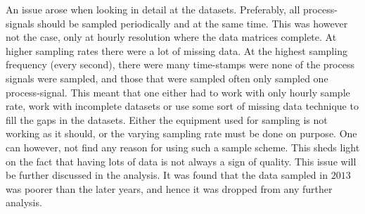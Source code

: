         
        
        An issue arose when looking in detail at the datasets. Preferably, all process-signals should be sampled periodically and at the same time. This was however not the case, only at hourly resolution where the data matrices complete. At higher sampling rates there were a lot of missing data. At the highest sampling frequency (every second), there were many time-stamps were none of the process signals were sampled, and those that were sampled often only sampled one process-signal. This meant that one either had to work with only hourly sample rate, work with incomplete datasets or use some sort of missing data technique to fill the gaps in the datasets. Either the equipment used for sampling is not working as it should, or the varying sampling rate must be done on purpose. One can however, not find any reason for using such a sample scheme. This sheds light on the fact that having lots of data is not always a sign of quality. This issue will be further discussed in the analysis. It was found that the data sampled in $2013$ was poorer than the later years, and hence it was dropped from any further analysis. 
        
